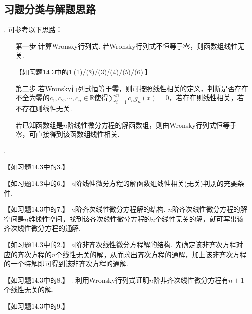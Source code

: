 \documentclass[12pt,UTF8,fleqn]{ctexart}
\begin{document}
\subsection{习题分类与解题思路}
\begin{enumerate}
. 可参考以下思路：
\begin{enumerate}
\item[第一步]计算Wronsky行列式. 若Wronsky行列式不恒等于零，则函数组线性无关.

【如习题14.3中的1.(1)/(2)/(3)/(4)/(5)/(6).】
\item[第二步]若Wronsky行列式恒等于零，则可按照线性相关的定义，判断是否存在不全为零的$c_1,c_2,\cdots,c_n\in\mathbb R$使得$\sum_{i=1}^nc_ng_n(x)=0$，若存在则线性相关，若不存在则线性无关.

若已知函数组是$n$阶线性微分方程的解函数组，则由Wronsky行列式恒等于零，可直接得到该函数组线性相关.
\end{enumerate}
. 

【如习题14.3中的3.】
.

【如习题14.3中的6.】
$n$阶线性微分方程的解函数组线性相关(无关)判别的充要条件.

【如习题14.3中的7.】
$n$阶齐次线性微分方程解的结构. $n$阶齐次线性微分方程的解空间是$n$维线性空间，找到该齐次线性微分方程的$n$个线性无关的解，就可写出该齐次线性微分方程的通解.

【如习题14.3中的2.】
$n$阶非齐次线性微分方程解的结构. 先确定该非齐次方程对应的齐次方程的$n$个线性无关的解，从而求出齐次方程的通解，加上该非齐次方程的一个特解即可得到该非齐次方程的通解.

【如习题14.3中的8.】
. 利用Wronsky行列式证明$n$阶非齐次线性微分方程有$n+1$个线性无关的解.

【如习题14.3中的9.】
\end{enumerate}
\end{document}

